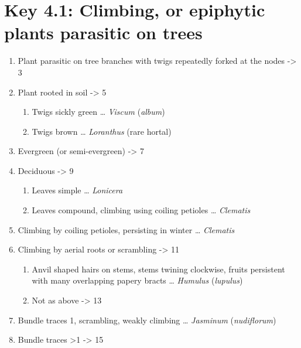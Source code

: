 \documentclass[openany]{book}
\providecommand{\tightlist}{%
  \setlength{\itemsep}{0pt}\setlength{\parskip}{0pt}}
\begin{document}
\hypertarget{key-4.1-climbing-or-epiphytic-plants-parasitic-on-trees}{%
\section*{Key 4.1: Climbing, or epiphytic plants parasitic on trees}\label{key-4.1-climbing-or-epiphytic-plants-parasitic-on-trees}}

\begin{enumerate}
\def\labelenumi{\arabic{enumi}.}
\tightlist
\item
  Plant parasitic on tree branches with twigs repeatedly forked at the nodes -\textgreater{} 3
\item
  Plant rooted in soil -\textgreater{} 5

  \begin{enumerate}
  \def\labelenumii{\arabic{enumii}.}
  \setcounter{enumii}{2}
  \tightlist
  \item
    Twigs sickly green \ldots{} \emph{Viscum} (\emph{album})
  \item
    Twigs brown \ldots{} \emph{Loranthus} (rare hortal)
  \end{enumerate}
\item
  Evergreen (or semi-evergreen) -\textgreater{} 7
\item
  Deciduous -\textgreater{} 9

  \begin{enumerate}
  \def\labelenumii{\arabic{enumii}.}
  \setcounter{enumii}{6}
  \tightlist
  \item
    Leaves simple \ldots{} \emph{Lonicera}
  \item
    Leaves compound, climbing using coiling petioles \ldots{} \emph{Clematis}
  \end{enumerate}
\item
  Climbing by coiling petioles, persisting in winter \ldots{} \emph{Clematis}
\item
  Climbing by aerial roots or scrambling -\textgreater{} 11

  \begin{enumerate}
  \def\labelenumii{\arabic{enumii}.}
  \setcounter{enumii}{10}
  \tightlist
  \item
    Anvil shaped hairs on stems, stems twining clockwise, fruits persistent with many overlapping papery bracts \ldots{} \emph{Humulus} (\emph{lupulus})
  \item
    Not as above -\textgreater{} 13
  \end{enumerate}
\item
  Bundle traces 1, scrambling, weakly climbing \ldots{} \emph{Jasminum} (\emph{nudiflorum})
\item
  Bundle traces \textgreater{}1 -\textgreater{} 15


\end{enumerate}
\end{document}

